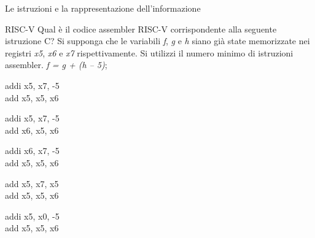 \documentclass[11pt]{article}
\begin{document}
\begin{quiz}{Le istruzioni e la rappresentazione dell'informazione}

\begin{multi}[points=1,,shuffle=true]{RISC-V}
Qual è il codice assembler RISC-V corrispondente alla seguente istruzione C? Si supponga che le variabili \textit{f}, \textit{g} e \textit{h} siano già state memorizzate nei registri \textit{x5}, \textit{x6} e \textit{x7} rispettivamente. Si utilizzi il numero minimo di istruzioni assembler.
%
\textit{f = g + (h – 5)};
%
\item* addi x5, x7, -5 \\ add x5, x5, x6
\item  addi x5, x7, -5 \\ add x6, x5, x6
\item  addi x6, x7, -5 \\ add x5, x5, x6
\item  add  x5, x7, x5 \\ add x5, x5, x6
\item  addi x5, x0, -5 \\ add x5, x5, x6        
\end{multi}






\end{quiz}
\end{document}
